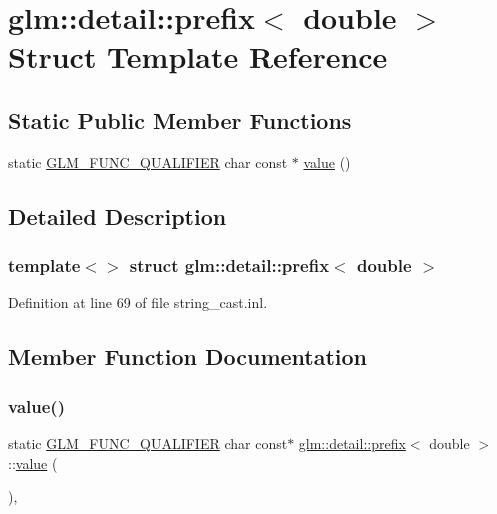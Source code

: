 \hypertarget{structglm_1_1detail_1_1prefix_3_01double_01_4}{}\section{glm\+::detail\+::prefix$<$ double $>$ Struct Template Reference}
\label{structglm_1_1detail_1_1prefix_3_01double_01_4}
\subsection*{Static Public Member Functions}
\begin{DoxyCompactItemize}
\item 
static \mbox{\hyperlink{setup_8hpp_a33fdea6f91c5f834105f7415e2a64407}{G\+L\+M\+\_\+\+F\+U\+N\+C\+\_\+\+Q\+U\+A\+L\+I\+F\+I\+ER}} char const  $\ast$ \mbox{\hyperlink{structglm_1_1detail_1_1prefix_3_01double_01_4_a39aa4646d7de33a2382c92db849d6eb5}{value}} ()
\end{DoxyCompactItemize}


\subsection{Detailed Description}
\subsubsection*{template$<$$>$\newline
struct glm\+::detail\+::prefix$<$ double $>$}



Definition at line 69 of file string\+\_\+cast.\+inl.



\subsection{Member Function Documentation}
\mbox{\label{structglm_1_1detail_1_1prefix_3_01double_01_4_a39aa4646d7de33a2382c92db849d6eb5}} 
\subsubsection{\texorpdfstring{value()}{value()}}
{\footnotesize\ttfamily static \mbox{\hyperlink{setup_8hpp_a33fdea6f91c5f834105f7415e2a64407}{G\+L\+M\+\_\+\+F\+U\+N\+C\+\_\+\+Q\+U\+A\+L\+I\+F\+I\+ER}} char const$\ast$ \mbox{\hyperlink{structglm_1_1detail_1_1prefix}{glm\+::detail\+::prefix}}$<$ double $>$\+::\mbox{\hyperlink{glad_8h_a03aff08f73d7fde3d1a08e0abd8e84fa}{value}} (\begin{DoxyParamCaption}{ }\end{DoxyParamCaption})\hspace{0.3cm}{\ttfamily [inline]}, {\ttfamily [static]}}



